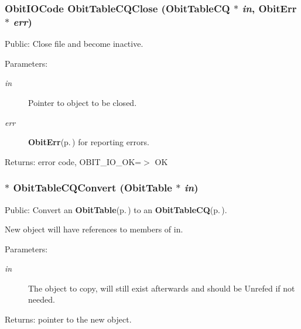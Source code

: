 \subsubsection{\setlength{\rightskip}{0pt plus 5cm}Obit\-IOCode Obit\-Table\-CQClose ({\bf Obit\-Table\-CQ} $\ast$ {\em in}, {\bf Obit\-Err} $\ast$ {\em err})}\label{ObitTableCQ_8c_a25}


Public: Close file and become inactive. 

\begin{Desc}
\item[Parameters:]
\begin{description}
\item[{\em in}]Pointer to object to be closed. \item[{\em err}]{\bf Obit\-Err}{\rm (p.\,\pageref{structObitErr})} for reporting errors. \end{description}
\end{Desc}
\begin{Desc}
\item[Returns:]error code, OBIT\_\-IO\_\-OK=$>$ OK \end{Desc}
\subsubsection{$\ast$ Obit\-Table\-CQConvert ({\bf Obit\-Table} $\ast$ {\em in})}\label{ObitTableCQ_8c_a19}


Public: Convert an {\bf Obit\-Table}{\rm (p.\,\pageref{structObitTable})} to an {\bf Obit\-Table\-CQ}{\rm (p.\,\pageref{structObitTableCQ})}. 

New object will have references to members of in. \begin{Desc}
\item[Parameters:]
\begin{description}
\item[{\em in}]The object to copy, will still exist afterwards and should be Unrefed if not needed. \end{description}
\end{Desc}
\begin{Desc}
\item[Returns:]pointer to the new object. \end{Desc}
